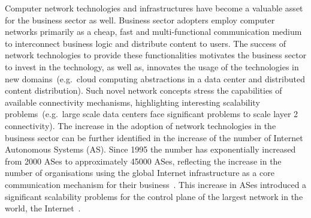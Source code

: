 Computer network technologies and infrastructures have become a valuable asset
for the business sector as well. Business sector adopters employ computer
networks primarily as a cheap, fast and multi-functional communication medium to
interconnect business logic and distribute content to users. The success of
network technologies to provide these functionalities motivates the business
sector to invest in the technology, as well as, innovates the usage of the
technologies in new domains~(e.g.~cloud computing abstractions in a data center
and distributed content distribution). Such novel network concepts stress the
capabilities of available connectivity mechanisms, highlighting interesting
scalability problems~(e.g.~large scale data centers face significant problems to
scale layer 2 connectivity).  The increase in the adoption of network
technologies in the business sector can be further identified in the increase of
the number of Internet Autonomous Systems (AS).  Since 1995 the number has
exponentially increased from 2000 ASes to approximately 45000 ASes, reflecting
the increase in the number of organisations using the global Internet
infrastructure as a core communication mechanism for their
business~\cite{potaroo}. This increase in ASes introduced a significant
scalability problems for the control plane of the largest network in the world,
the Internet~\cite{bgp_instab_labovitz:1997}. 




